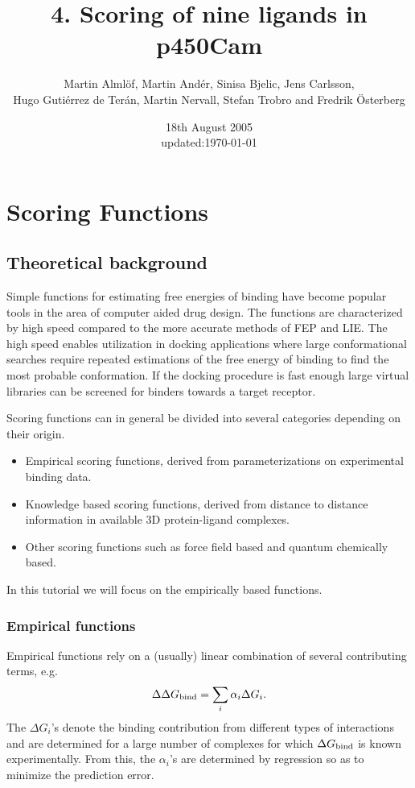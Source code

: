 \documentclass[a4paper,12pt]{article}
\title{4. Scoring of nine ligands in p450Cam}
\author{Martin Alml\"{o}f, Martin And\'er, Sinisa Bjelic, Jens Carlsson, \\ Hugo Guti\'errez de Ter\'an, Martin Nervall, Stefan Trobro and Fredrik \"{O}sterberg}
\date{18th August 2005\\ \footnotesize{updated:\today}}
\newcommand{\dGb}{\ensuremath{\Delta G_{\rm bind}}}
\begin{document}
\maketitle
\tableofcontents
\newpage
\renewcommand{\thefigure}{\arabic{figure}}

\section{Scoring Functions}

\subsection{Theoretical background}
Simple functions for  estimating free energies of  binding have become
popular  tools  in  the  area  of computer  aided  drug  design.   The
functions  are  characterized  by  high speed  compared  to  the  more
accurate methods of FEP and LIE. The high speed enables utilization in
docking  applications  where  large  conformational  searches  require
repeated estimations  of the free energy  of binding to find  the most
probable conformation. If  the docking procedure is  fast enough large
virtual  libraries  can  be  screened for  binders  towards  a  target
receptor.

Scoring functions  can in general  be divided into  several categories
depending on their origin.

\begin{itemize}
\item Empirical scoring functions, derived from parameterizations on
experimental binding data.

\item Knowledge based scoring functions, derived from distance to
distance information in available 3D protein-ligand complexes.

\item Other scoring functions such as force field based and
quantum chemically based.
\end{itemize}

\noindent In this tutorial we will focus on the empirically based
functions.


\subsubsection{Empirical functions}
Empirical functions rely on a (usually) linear combination of
several contributing terms, e.g.
        \begin{equation} \label{emp_gen}
        \Delta \dGb = \sum_{i} \alpha_i \Delta G_{i}.
        \end{equation}
The $\Delta G_i$'s denote the binding contribution from different
types of interactions and are determined for a large number of
complexes for which {\dGb} is known experimentally. From this, the
$\alpha_i$'s are determined by regression so as to minimize the
prediction error.
\end{document}
